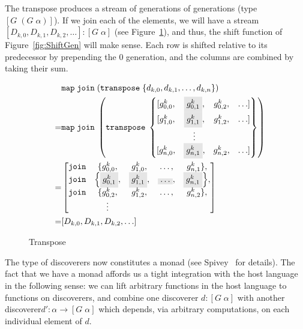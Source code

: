 The transpose produces a stream of generations of generations (type $[G\;(G\;\alpha)]$). If we join each of the elements, we will have a stream $[D_{k,0}, D_{k,1}, D_{k,2}, \ldots] : [G\;\alpha]$ (see Figure~\ref{fig:Transpose}), and thus, the shift function of Figure~\ref{fig:ShiftGen} will make sense. Each row is shifted relative to its predecessor by prepending the 0 generation, and the columns are combined by taking their sum.

\begin{figure}
  \begin{align*}
    &\code{map}\;\code{join}\;(\code{transpose}\;\{d_{k,0}, d_{k,1}, \ldots, d_{k,n}\})\\
  = &\code{map}\;\code{join}\;\left(\code{transpose}\;\left\{\begin{matrix}
        [g^k_{0,0}, & \colorbox{gray}{$g^k_{0,1}$}, & g^k_{0,2}, &\ldots]\\
        [g^k_{1,0}, & \colorbox{gray}{$g^k_{1,1}$}, & g^k_{1,2}, &\ldots]\\
                  & \vdots\\
        [g^k_{n,0}, & \colorbox{gray}{$g^k_{n,1}$}, & g^k_{n,2}, &\ldots]
      \end{matrix}\right\}\right)\\
      = &\left[\begin{matrix}
        \code{join}&\{g^k_{0,0}, & g^k_{1,0}, &\ldots, & g^k_{n,1}\},\\
        \code{join}&\Big\{\colorbox{gray}{$g^k_{0,1}$}, & \colorbox{gray}{$g^k_{1,1}$}, &\colorbox{gray}{$\ldots$}, & \colorbox{gray}{$g^k_{n,1}$}\Big\},\\
        \code{join}&\{g^k_{0,2}, & g^k_{1,2}, &\ldots, & g^k_{n,2}\},\\
                   & \vdots
                 \end{matrix}\right]\\
      \quad= &[D_{k,0}, D_{k,1}, D_{k,2}, \ldots]
  \end{align*}
\caption{Transpose}
\label{fig:Transpose}
\end{figure}

The type of discoverers now constitutes a monad (see Spivey~\cite{SearchAlgebras} for details). The fact that we have a monad affords us a tight integration with the host language in the following sense: we can lift arbitrary functions in the host language to functions on discoverers, and combine one discoverer $d : [G\;\alpha]$ with another discoverer\linebreak $d' : \alpha \rightarrow [G\;\alpha]$ which depends, via arbitrary computations, on each individual element of $d$. 

